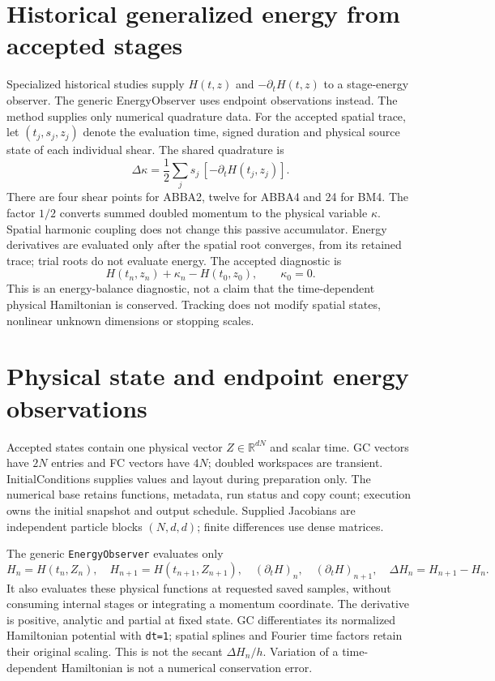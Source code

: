 \documentclass[11pt,a4paper]{article}
\begin{document}
\section{Historical generalized energy from accepted stages}
Specialized historical studies supply $H(t,z)$ and $-\partial_tH(t,z)$ to a stage-energy observer. The generic EnergyObserver uses endpoint observations instead.
The method supplies only numerical quadrature data. For the accepted spatial
trace, let $(t_j,s_j,z_j)$ denote the evaluation time, signed duration and
physical source state of each individual shear. The shared quadrature is
\[
 \Delta\kappa=\frac12\sum_j s_j\,[-\partial_tH(t_j,z_j)].
\]
There are four shear points for ABBA2, twelve for ABBA4 and 24 for BM4. The factor $1/2$ converts summed doubled momentum to the
physical variable $\kappa$. Spatial harmonic coupling does not change this
passive accumulator. Energy derivatives are evaluated only after the spatial
root converges, from its retained trace; trial roots do not evaluate energy.
The accepted diagnostic is
\[
 H(t_n,z_n)+\kappa_n-H(t_0,z_0),\qquad \kappa_0=0.
\]
This is an energy-balance diagnostic, not a claim that the time-dependent
physical Hamiltonian is conserved. Tracking does not modify spatial states,
nonlinear unknown dimensions or stopping scales.

\section{Physical state and endpoint energy observations}
Accepted states contain one physical vector $Z\in\mathbb{R}^{dN}$ and scalar time.
GC vectors have $2N$ entries and FC vectors have $4N$; doubled workspaces are
transient. InitialConditions supplies values and layout during preparation only.
The numerical base retains functions, metadata, run status and copy count;
execution owns the initial snapshot and output schedule. Supplied Jacobians are
independent particle blocks $(N,d,d)$; finite differences use dense matrices.

The generic \texttt{EnergyObserver} evaluates only
\[
 H_n=H(t_n,Z_n),\quad H_{n+1}=H(t_{n+1},Z_{n+1}),\quad
 (\partial_tH)_n,\quad (\partial_tH)_{n+1},\quad
 \Delta H_n=H_{n+1}-H_n.
\]
It also evaluates these physical functions at requested saved samples, without
consuming internal stages or integrating a momentum coordinate. The derivative
is positive, analytic and partial at fixed state. GC differentiates its normalized
Hamiltonian potential with \texttt{dt=1}; spatial splines and Fourier time factors
retain their original scaling. This is not the secant $\Delta H_n/h$.
Variation of a time-dependent Hamiltonian is not a numerical conservation error.
\end{document}
